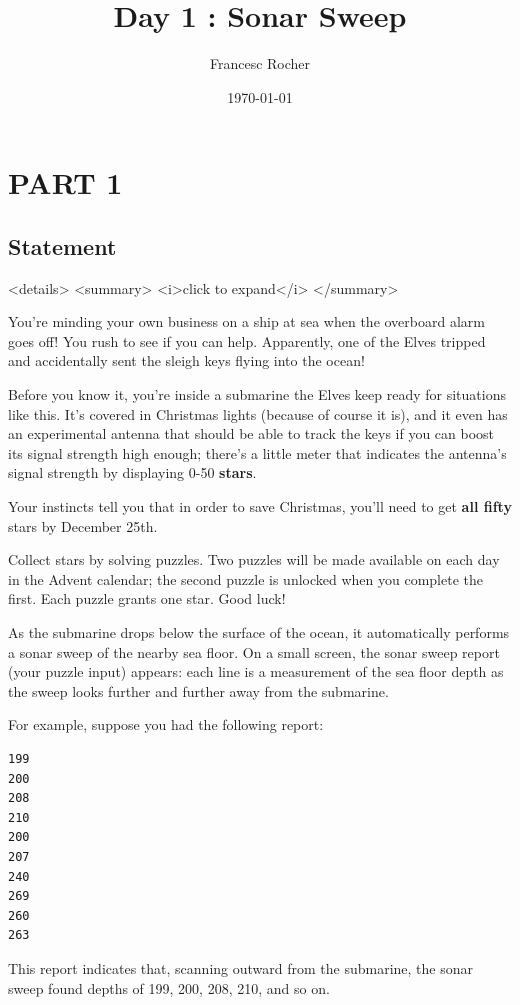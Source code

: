 \documentclass[11pt]{article}
\author{Francesc Rocher}
\date{\today}
\title{Day 1 : Sonar Sweep}
\begin{document}
\maketitle
\tableofcontents


\section{PART 1}
\label{sec:org2eadb98}
\subsection{Statement}
\label{sec:org9918733}
\begin{html}
<details>
<summary>
  <i>click to expand</i>
</summary>
\end{html}

You're minding your own business on a ship at sea when the overboard alarm goes
off! You rush to see if you can help. Apparently, one of the Elves tripped and
accidentally sent the sleigh keys flying into the ocean!

Before you know it, you're inside a submarine the Elves keep ready for
situations like this. It's covered in Christmas lights (because of course it
is), and it even has an experimental antenna that should be able to track the
keys if you can boost its signal strength high enough; there's a little meter
that indicates the antenna's signal strength by displaying 0-50 \textbf{stars}.

Your instincts tell you that in order to save Christmas, you'll need to get \textbf{all
fifty} stars by December 25th.

Collect stars by solving puzzles. Two puzzles will be made available on each day
in the Advent calendar; the second puzzle is unlocked when you complete the
first. Each puzzle grants one star. Good luck!

As the submarine drops below the surface of the ocean, it automatically performs
a sonar sweep of the nearby sea floor. On a small screen, the sonar sweep report
(your puzzle input) appears: each line is a measurement of the sea floor depth
as the sweep looks further and further away from the submarine.

For example, suppose you had the following report:

\begin{verbatim}
199
200
208
210
200
207
240
269
260
263
\end{verbatim}

This report indicates that, scanning outward from the submarine, the sonar sweep
found depths of 199, 200, 208, 210, and so on.
\end{document}
